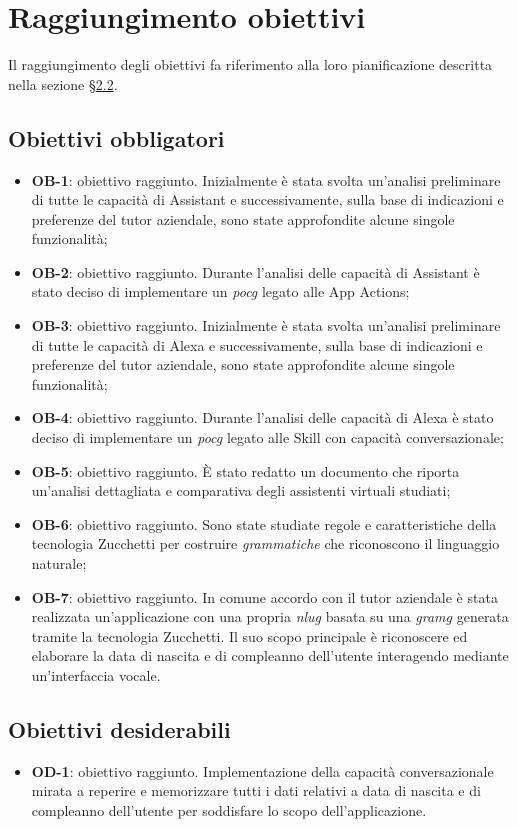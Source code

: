 \section{Raggiungimento obiettivi}
Il raggiungimento degli obiettivi fa riferimento alla loro pianificazione descritta nella sezione §\hyperref[obiettivi]{2.2}.
\subsection{Obiettivi obbligatori}
\begin{itemize}
	\item \textbf{OB-1}: obiettivo raggiunto. Inizialmente è stata svolta un'analisi preliminare di tutte le capacità di Assistant e successivamente, sulla base di indicazioni e preferenze del tutor aziendale, sono state approfondite alcune singole funzionalità;
	\item \textbf{OB-2}: obiettivo raggiunto. Durante l'analisi delle capacità di Assistant è stato deciso di implementare un \emph{\gls{pocg}} legato alle App Actions;
	\item \textbf{OB-3}: obiettivo raggiunto. Inizialmente è stata svolta un'analisi preliminare di tutte le capacità di Alexa e successivamente, sulla base di indicazioni e preferenze del tutor aziendale, sono state approfondite alcune singole funzionalità;
	\item \textbf{OB-4}: obiettivo raggiunto. Durante l'analisi delle capacità di Alexa è stato deciso di implementare un \emph{\gls{pocg}} legato alle Skill con capacità conversazionale;
	\item \textbf{OB-5}: obiettivo raggiunto. È stato redatto un documento che riporta un'analisi dettagliata e comparativa degli assistenti virtuali studiati;
	\item \textbf{OB-6}: obiettivo raggiunto. Sono state studiate regole e caratteristiche della tecnologia Zucchetti per costruire \emph{grammatiche} che riconoscono il linguaggio naturale;
	\item \textbf{OB-7}: obiettivo raggiunto. In comune accordo con il tutor aziendale è stata realizzata un'applicazione con una propria \emph{\gls{nlug}} basata su una \emph{\gls{gramg}} generata tramite la tecnologia Zucchetti. Il suo scopo principale è riconoscere ed elaborare la data di nascita e di compleanno dell'utente interagendo mediante un'interfaccia vocale.
\end{itemize}
\subsection{Obiettivi desiderabili}
\begin{itemize}
	\item \textbf{OD-1}: obiettivo raggiunto. Implementazione della capacità conversazionale mirata a reperire e memorizzare tutti i dati relativi a data di nascita e di compleanno dell'utente per soddisfare lo scopo dell'applicazione.
\end{itemize}
